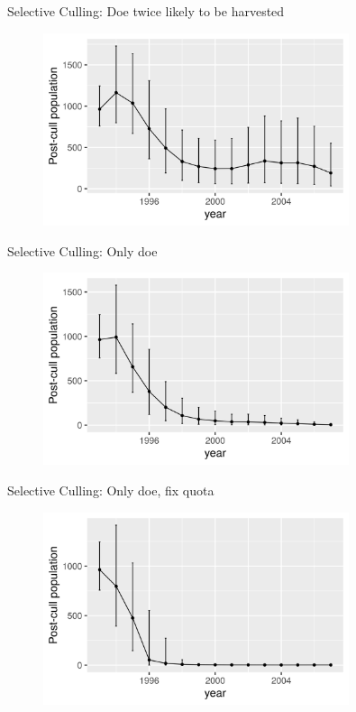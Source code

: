 \documentclass{beamer}
\begin{document}
\begin{frame}{Selective Culling: Doe twice likely to be harvested}
\begin{figure}[ht]
	\centering
	\includegraphics[width=0.8\textwidth]{fig/Chicago_deer/more_doe_porprotion.jpg}
	\label{proportion_moredoe}
\end{figure}
\end{frame}

\begin{frame}{Selective Culling: Only doe}
\begin{figure}[ht]
	\centering
	\includegraphics[width=0.8\textwidth]{fig/Chicago_deer/only_doe.jpg}
	\label{proportion_onlydoe}
\end{figure}
\end{frame}

\begin{frame}{Selective Culling: Only doe, fix quota}
\begin{figure}[ht]
	\centering
	\includegraphics[width=0.8\textwidth]{fig/Chicago_deer/only_doe_quota.jpg}
	\label{quota_onlydoe}
\end{figure}
\end{frame}
\end{document}
